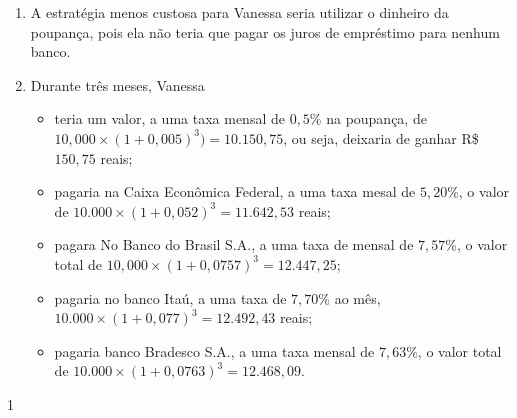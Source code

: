\begin{resposta}{}
{
  \begin{enumerate}
    \item A estratégia menos custosa para Vanessa seria utilizar o dinheiro da poupança, pois ela não teria que pagar os juros de empréstimo para nenhum banco.
    \item Durante três meses, Vanessa 

    \begin{itemize}
      \item teria um valor, a uma taxa mensal de $0{,}5$\% na poupança, de $10,000\times(1+0{,}005)^3) = 10.150{,}75$, ou seja, deixaria de ganhar R\$ $150{,}75$ reais;
      \item pagaria na Caixa Econômica Federal, a uma taxa mesal de $5{,}20\%$, o valor de $10.000\times(1+0{,}052)^3=11.642{,}53$ reais;
      \item pagara No Banco do Brasil S.A., a uma taxa de mensal de $7{,}57$\%, o valor total de $10{,}000\times(1+0{,}0757)^3=12.447{,}25$;
      \item pagaria no banco Itaú, a uma taxa de $7{,}70$\% ao mês, $10.000\times(1+0{,}077)^3=12.492{,}43$ reais;
      \item pagaria banco Bradesco S.A., a uma taxa mensal de $7{,}63$\%, o valor total de $10.000\times(1+0{,}0763)^3=12.468{,}09$.
    \end{itemize}
  \end{enumerate}
}{1}
\end{resposta}

